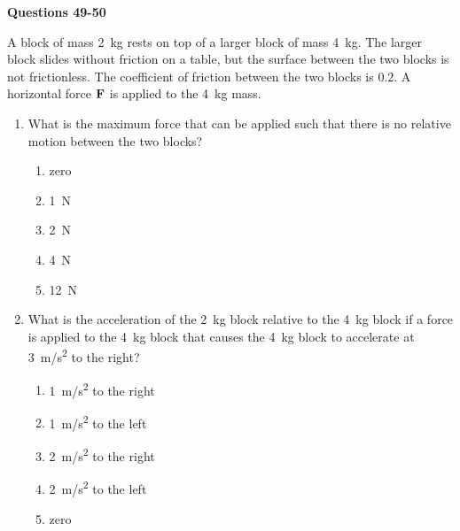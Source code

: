 \documentclass{../../oss-apphys}
\begin{document}
\begin{multicols}{2}
\begin{enumerate}[resume,leftmargin=18pt]
  \end{enumerate}
  \columnbreak
  
  \textbf{Questions 49-50}

  A block of mass \SI{2}{\kilo\gram} rests on top of a larger block of mass
  \SI{4}{\kilo\gram}. The larger block slides without friction on a table, but
  the surface between the two blocks is not frictionless. The coefficient of
  friction between the two blocks is $0.2$. A horizontal force $\mathbf{F}$ is
  applied to the \SI{4}{\kilo\gram} mass.
  \begin{enumerate}[resume,leftmargin=18pt]
  \item What is the maximum force that can be applied such that there is no
    relative motion between the two blocks?
    \begin{enumerate}[noitemsep,topsep=0pt,leftmargin=18pt,label=(\Alph*)]
    \item zero
    \item \SI{1}{\newton}
    \item \SI{2}{\newton}
    \item \SI{4}{\newton}
    \item \SI{12}{\newton}
    \end{enumerate}

  \item What is the acceleration of the \SI{2}{\kilo\gram} block relative to the
    \SI{4}{\kilo\gram} block if a force is applied to the \SI{4}{\kilo\gram}
    block that causes the \SI{4}{\kilo\gram} block to accelerate at
    \SI{3}{m/s^2} to the right?
    \begin{enumerate}[noitemsep,topsep=0pt,leftmargin=18pt,label=(\Alph*)]
    \item\SI{1}{m/s^2} to the right
    \item\SI{1}{m/s^2} to the left
    \item\SI{2}{m/s^2} to the right
    \item\SI{2}{m/s^2} to the left
    \item zero
    \end{enumerate}
  \end{enumerate}
\end{multicols}
\end{document}
